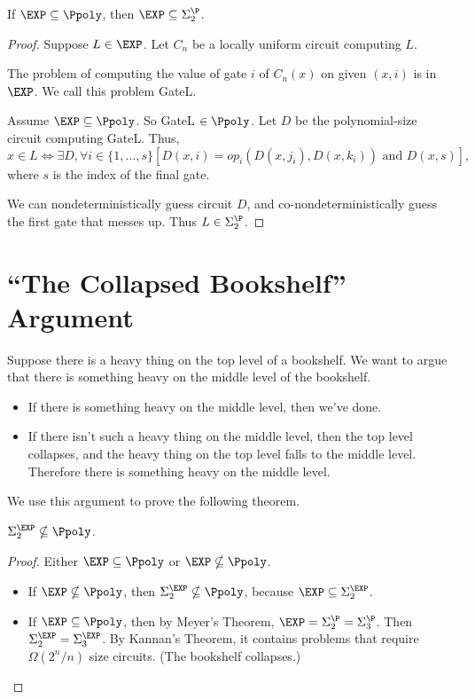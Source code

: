 \documentclass[letterpaper, 12pt]{article}
\begin{document}
\begin{theorem}[Meyer]
	If $\EXP \subseteq \Ppoly$, then $\EXP \subseteq \Sigma_2^\P$.
\end{theorem}

\begin{proof}
	Suppose $L \in \EXP$. Let $C_n$ be a locally uniform circuit computing $L$.
	
	The problem of computing the value of gate $i$ of $C_n(x)$ on given $(x,i)$ is in $\EXP$. We call this problem GateL.
	
	Assume $\EXP \subseteq \Ppoly$. So GateL $\in \Ppoly$. Let $D$ be the polynomial-size circuit computing GateL. Thus,
	\[x \in L \Leftrightarrow \exists D, \forall i \in \{1,\dots, s\} \left[ D(x,i) = op_i(D(x,j_i), D(x,k_i)) \mbox{ and } D(x,s)\right],\] where $s$ is the index of the final gate.
	
	We can nondeterministically guess circuit $D$, and co-nondeterministically guess the first gate that messes up. Thus $L \in \Sigma_2^\P$.
\end{proof}

\section{``The Collapsed Bookshelf'' Argument}

Suppose there is a heavy thing on the top level of a bookshelf. We want to argue that there is something heavy on the middle level of the bookshelf.
\begin{itemize}
	\item If there is something heavy on the middle level, then we've done.
	\item If there isn't such a heavy thing on the middle level, then the top level collapses, and the heavy thing on the top level falls to the middle level. Therefore there is something heavy on the middle level.
\end{itemize}

We use this argument to prove the following theorem.

\begin{theorem}
	$\Sigma_2^\EXP \nsubseteq \Ppoly$.
\end{theorem}

\begin{proof}
	Either $\EXP \subseteq \Ppoly$ or $\EXP \nsubseteq \Ppoly$.
	\begin{itemize}
		\item If $\EXP \nsubseteq \Ppoly$, then $\Sigma_2^\EXP \nsubseteq \Ppoly$, because $\EXP \subseteq \Sigma_2^\EXP$.
		\item If $\EXP \subseteq \Ppoly$, then by Meyer's Theorem, $\EXP = \Sigma_2^\P = \Sigma_3^\P$. Then $\Sigma_2^\EXP = \Sigma_3^\EXP$. By Kannan's Theorem, it contains problems that require $\Omega(2^n/n)$ size circuits. (The bookshelf collapses.)
	\end{itemize}
\end{proof}
\end{document}
